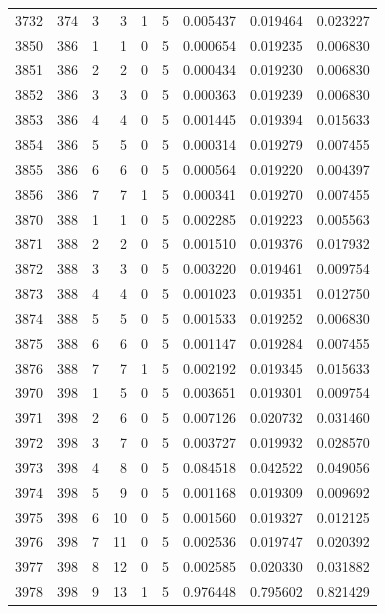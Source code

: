 \begin{longtable}{rrrrrrrrr}
3732 & 374 & 3 & 3 & 1 & 5 & 0.005437 & 0.019464 & 0.023227 \\
3850 & 386 & 1 & 1 & 0 & 5 & 0.000654 & 0.019235 & 0.006830 \\
3851 & 386 & 2 & 2 & 0 & 5 & 0.000434 & 0.019230 & 0.006830 \\
3852 & 386 & 3 & 3 & 0 & 5 & 0.000363 & 0.019239 & 0.006830 \\
3853 & 386 & 4 & 4 & 0 & 5 & 0.001445 & 0.019394 & 0.015633 \\
3854 & 386 & 5 & 5 & 0 & 5 & 0.000314 & 0.019279 & 0.007455 \\
3855 & 386 & 6 & 6 & 0 & 5 & 0.000564 & 0.019220 & 0.004397 \\
3856 & 386 & 7 & 7 & 1 & 5 & 0.000341 & 0.019270 & 0.007455 \\
3870 & 388 & 1 & 1 & 0 & 5 & 0.002285 & 0.019223 & 0.005563 \\
3871 & 388 & 2 & 2 & 0 & 5 & 0.001510 & 0.019376 & 0.017932 \\
3872 & 388 & 3 & 3 & 0 & 5 & 0.003220 & 0.019461 & 0.009754 \\
3873 & 388 & 4 & 4 & 0 & 5 & 0.001023 & 0.019351 & 0.012750 \\
3874 & 388 & 5 & 5 & 0 & 5 & 0.001533 & 0.019252 & 0.006830 \\
3875 & 388 & 6 & 6 & 0 & 5 & 0.001147 & 0.019284 & 0.007455 \\
3876 & 388 & 7 & 7 & 1 & 5 & 0.002192 & 0.019345 & 0.015633 \\
3970 & 398 & 1 & 5 & 0 & 5 & 0.003651 & 0.019301 & 0.009754 \\
3971 & 398 & 2 & 6 & 0 & 5 & 0.007126 & 0.020732 & 0.031460 \\
3972 & 398 & 3 & 7 & 0 & 5 & 0.003727 & 0.019932 & 0.028570 \\
3973 & 398 & 4 & 8 & 0 & 5 & 0.084518 & 0.042522 & 0.049056 \\
3974 & 398 & 5 & 9 & 0 & 5 & 0.001168 & 0.019309 & 0.009692 \\
3975 & 398 & 6 & 10 & 0 & 5 & 0.001560 & 0.019327 & 0.012125 \\
3976 & 398 & 7 & 11 & 0 & 5 & 0.002536 & 0.019747 & 0.020392 \\
3977 & 398 & 8 & 12 & 0 & 5 & 0.002585 & 0.020330 & 0.031882 \\
3978 & 398 & 9 & 13 & 1 & 5 & 0.976448 & 0.795602 & 0.821429 \\
\end{longtable}
